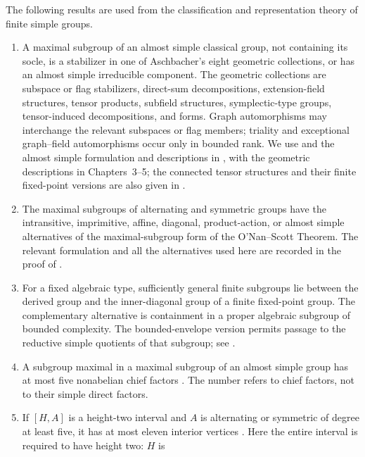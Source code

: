 \begin{proposition}\label{cls:literature}
The following results are used from the classification and representation
theory of finite simple groups.
\begin{enumerate}[label=\textup{(L\arabic*)}]
\item A maximal subgroup of an almost simple classical group, not
containing its socle, is a stabilizer in one of Aschbacher's eight
geometric collections, or has an almost simple irreducible component.
The geometric collections are subspace or flag stabilizers, direct-sum
decompositions, extension-field structures, tensor products, subfield
structures, symplectic-type groups, tensor-induced decompositions, and
forms.  Graph automorphisms may interchange the relevant subspaces or
flag members; triality and exceptional graph--field automorphisms occur
only in bounded rank.  We use
\cite{Aschbacher1984} and the almost simple formulation and descriptions
in \cite[Table~1.2.A and Theorem~1.2.1, pp.~3--4]{KleidmanLiebeck1990},
with the geometric descriptions in Chapters~3--5; the connected tensor
structures and their finite fixed-point versions are also given in
\cite[Theorem~2 and Section~4(5)]{LiebeckSeitzClassical1998}.
\item The maximal subgroups of alternating and symmetric groups have
the intransitive, imprimitive, affine, diagonal, product-action, or
almost simple alternatives of the maximal-subgroup form of the
O'Nan--Scott Theorem.  The relevant formulation and all the alternatives
used here are recorded in the proof of
\cite[Proposition~3.1]{BurnessLiebeckShalev2017}.
\item For a fixed algebraic type, sufficiently general finite subgroups
lie between the derived group and the inner-diagonal group of a finite
fixed-point group.  The complementary alternative is containment in a
proper algebraic subgroup of bounded complexity.  The bounded-envelope
version permits passage to the reductive simple quotients of that
subgroup; see \cite[Theorems~0.5 and~12.3]{LarsenPink2011}.
\item A subgroup maximal in a maximal subgroup of an almost simple
group has at most five nonabelian chief factors
\cite[Proposition~8.1]{BurnessLiebeckShalev2017}.  The number refers to
chief factors, not to their simple direct factors.
\item If $[H,A]$ is a height-two interval and $A$ is alternating or
symmetric of degree at least five, it has at most eleven interior
vertices \cite[Theorem~D]{Basile2008}.  Here the entire interval is required to have height two: $H$ is

\end{enumerate}
\end{proposition}
